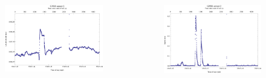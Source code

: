 \documentclass[xcolor=table]{beamer}
\begin{document}
\begin{frame}
\begin{columns}
\begin{figure}
        \includegraphics[scale=0.40]{thesis/graphics/gnssLong2-1.png}
      \end{figure}
      \vspace{-30pt}
      \begin{figure}
        \includegraphics[scale=0.40]{thesis/graphics/gnssSpeed2-1.png}
      \end{figure}
    \end{columns}  
\end{frame}
\end{document}
